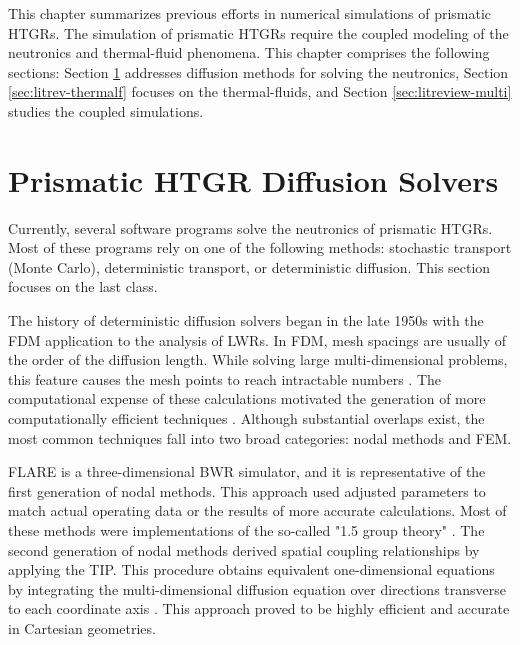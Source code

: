 This chapter summarizes previous efforts in numerical simulations of prismatic HTGRs.
The simulation of prismatic HTGRs require the coupled modeling of the neutronics and thermal-fluid phenomena.
This chapter comprises the following sections: Section \ref{sec:litreview-neut} addresses diffusion methods for solving the neutronics, Section \ref{sec:litrev-thermalf} focuses on the thermal-fluids, and Section \ref{sec:litreview-multi} studies the coupled simulations.

\section{Prismatic HTGR Diffusion Solvers}
\label{sec:litreview-neut}

Currently, several software programs solve the neutronics of prismatic \glspl{HTGR}.
Most of these programs rely on one of the following methods: stochastic transport (Monte Carlo), deterministic transport, or deterministic diffusion.
This section focuses on the last class.

The history of deterministic diffusion solvers began in the late 1950s with the \gls{FDM} application to the analysis of \glspl{LWR}.
In \gls{FDM}, mesh spacings are usually of the order of the diffusion length.
While solving large multi-dimensional problems, this feature causes the mesh points to reach intractable numbers \cite{lewis_finite_1986}.
The computational expense of these calculations motivated the generation of more computationally efficient techniques \cite{lawrence_progress_1986}.
Although substantial overlaps exist, the most common techniques fall into two broad categories: nodal methods and \gls{FEM}.

FLARE \cite{delp_flare_1964} is a three-dimensional \gls{BWR} simulator, and it is representative of the first generation of nodal methods.
This approach used adjusted parameters to match actual operating data or the results of more accurate calculations.
Most of these methods were implementations of the so-called "1.5 group theory" \cite{gupta_nodal_1981}.
The second generation of nodal methods derived spatial coupling relationships by applying the \gls{TIP}.
This procedure obtains equivalent one-dimensional equations by integrating the multi-dimensional diffusion equation over directions transverse to each coordinate axis \cite{lawrence_progress_1986}.
This approach proved to be highly efficient and accurate in Cartesian geometries.

